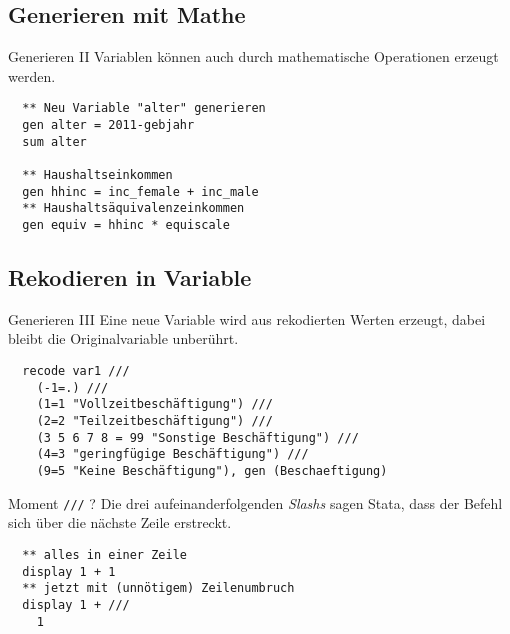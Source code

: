 \subsection{Generieren mit Mathe}
\begin{frame}[fragile]{Generieren II}  
Variablen können auch durch mathematische Operationen erzeugt werden.
\begin{lstlisting}
  ** Neu Variable "alter" generieren
  gen alter = 2011-gebjahr
  sum alter

  ** Haushaltseinkommen
  gen hhinc = inc_female + inc_male
  ** Haushaltsäquivalenzeinkommen
  gen equiv = hhinc * equiscale
\end{lstlisting}
\end{frame}

\subsection{Rekodieren in Variable}
\begin{frame}[fragile]{Generieren III}  
Eine neue Variable wird aus rekodierten Werten erzeugt, dabei bleibt die Originalvariable unberührt.
\begin{lstlisting}
  recode var1 ///
    (-1=.) ///
    (1=1 "Vollzeitbeschäftigung") ///
    (2=2 "Teilzeitbeschäftigung") ///
    (3 5 6 7 8 = 99 "Sonstige Beschäftigung") ///
    (4=3 "geringfügige Beschäftigung") ///
    (9=5 "Keine Beschäftigung"), gen (Beschaeftigung)
\end{lstlisting}


\end{frame}

\begin{frame}[fragile]{Moment \texttt{///} ?}    
Die drei aufeinanderfolgenden \textit{Slashs} sagen Stata, dass der Befehl sich über die nächste Zeile erstreckt. 
\begin{lstlisting}
  ** alles in einer Zeile
  display 1 + 1 
  ** jetzt mit (unnötigem) Zeilenumbruch
  display 1 + ///
    1
\end{lstlisting}

\end{frame}

